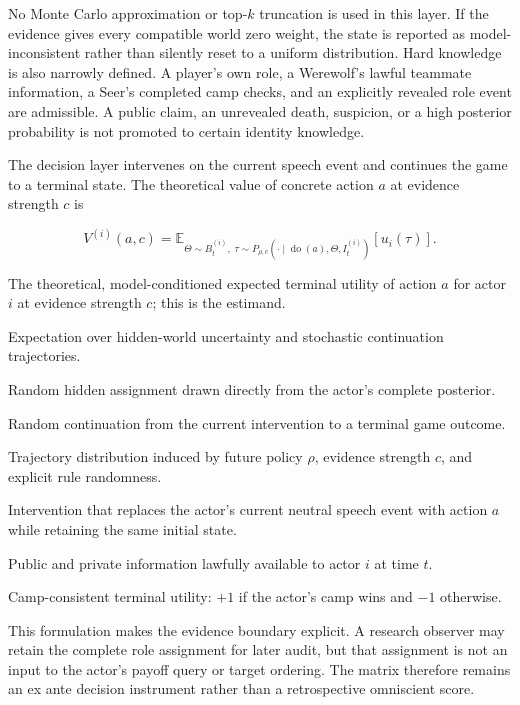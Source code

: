 \documentclass[11pt,a4paper]{article}
\begin{document}
No Monte Carlo approximation or top-$k$ truncation is used in this layer. If the evidence gives every compatible world zero weight, the state is reported as model-inconsistent rather than silently reset to a uniform distribution. Hard knowledge is also narrowly defined. A player's own role, a Werewolf's lawful teammate information, a Seer's completed camp checks, and an explicitly revealed role event are admissible. A public claim, an unrevealed death, suspicion, or a high posterior probability is not promoted to certain identity knowledge.

The decision layer intervenes on the current speech event and continues the game to a terminal state. The theoretical value of concrete action $a$ at evidence strength $c$ is

\[
V^{(i)}(a,c)=
\mathbb{E}_{\Theta\sim B_t^{(i)},\;
\tau\sim P_{\rho,c}(\cdot\mid \operatorname{do}(a),\Theta,I_t^{(i)})}
\left[u_i(\tau)\right].
\]

\begin{description}[style=nextline,leftmargin=3.4cm,labelwidth=3.0cm]
  \item[$V^{(i)}(a,c)$] The theoretical, model-conditioned expected terminal utility of action $a$ for actor $i$ at evidence strength $c$; this is the estimand.
  \item[$\mathbb{E}$] Expectation over hidden-world uncertainty and stochastic continuation trajectories.
  \item[$\Theta$] Random hidden assignment drawn directly from the actor's complete posterior.
  \item[$\tau$] Random continuation from the current intervention to a terminal game outcome.
  \item[$P_{\rho,c}$] Trajectory distribution induced by future policy $\rho$, evidence strength $c$, and explicit rule randomness.
  \item[$\operatorname{do}(a)$] Intervention that replaces the actor's current neutral speech event with action $a$ while retaining the same initial state.
  \item[$I_t^{(i)}$] Public and private information lawfully available to actor $i$ at time $t$.
  \item[$u_i(\tau)$] Camp-consistent terminal utility: $+1$ if the actor's camp wins and $-1$ otherwise.
\end{description}

This formulation makes the evidence boundary explicit. A research observer may retain the complete role assignment for later audit, but that assignment is not an input to the actor's payoff query or target ordering. The matrix therefore remains an ex ante decision instrument rather than a retrospective omniscient score.
\end{document}
